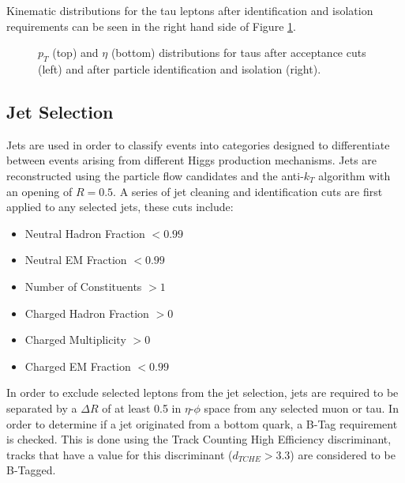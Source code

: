 Kinematic distributions for the tau leptons after identification and isolation requirements can be seen in the right hand side of Figure \ref{fig:taucuts}.
\begin{figure}[ht]
\centering
{}

\caption{$p_{T}$ (top) and $\eta$ (bottom) distributions for taus after acceptance cuts (left) and after particle identification and isolation (right).}
\label{fig:taucuts}
\end{figure}


\subsection{Jet Selection}
\label{sec:jetselection}
Jets are used in order to classify events into categories designed to differentiate between events arising from different Higgs production mechanisms. 
Jets are reconstructed using the particle flow candidates and the anti-$k_{T}$ algorithm\cite{ANTIKT} with an opening of $R = 0.5$. 
A series of jet cleaning and identification cuts are first applied to any selected jets, these cuts include:
\begin{itemize}
\item Neutral Hadron Fraction $< 0.99$
\item Neutral EM Fraction $< 0.99$
\item Number of Constituents $> 1$
\item Charged Hadron Fraction $> 0$
\item Charged Multiplicity $> 0$
\item Charged EM Fraction $< 0.99$
\end{itemize}
In order to exclude selected leptons from the jet selection, jets are required to be separated by a $\Delta R$ of at least 0.5 in $\eta$-$\phi$ space from any selected muon or tau.
In order to determine if a jet originated from a bottom quark, a B-Tag requirement is checked.
This is done using the Track Counting High Efficiency discriminant, tracks that have a value for this discriminant ($d_{TCHE} > 3.3$) are considered to be B-Tagged\cite{BTV_10_001}.

